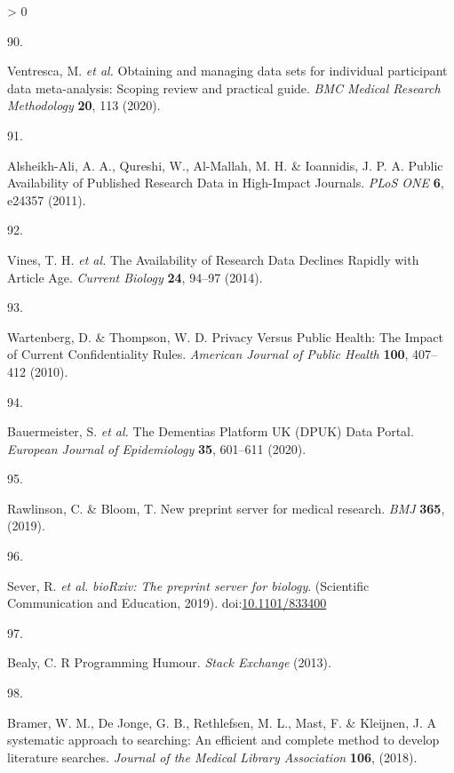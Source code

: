 \documentclass[a4paper, twoside]{templates/ociamthesis}
\newlength{\cslhangindent}
\newlength{\csllabelwidth}
\newenvironment{CSLReferences}[3] %
 {%
  \setlength{\parindent}{0pt}
  \ifodd #1 \everypar{\setlength{\hangindent}{\cslhangindent}}\ignorespaces\fi
  \ifnum #2 > 0
  \setlength{\parskip}{#2\baselineskip}
  \fi
 }%
 {}
\newcommand{\CSLLeftMargin}[1]{\parbox[t]{\maxof{\widthof{#1}}{\csllabelwidth}}{#1}}
\newcommand{\CSLRightInline}[1]{\parbox[t]{\linewidth - \csllabelwidth}{#1}}
\begin{document}
\begin{CSLReferences}{0}{0}
\leavevmode\hypertarget{ref-ventresca2020}{}%
\CSLLeftMargin{90. }
\CSLRightInline{Ventresca, M. \emph{et al.} Obtaining and managing data sets for individual participant data meta-analysis: Scoping review and practical guide. \emph{BMC Medical Research Methodology} \textbf{20}, 113 (2020).}

\leavevmode\hypertarget{ref-alsheikh-ali2011}{}%
\CSLLeftMargin{91. }
\CSLRightInline{Alsheikh-Ali, A. A., Qureshi, W., Al-Mallah, M. H. \& Ioannidis, J. P. A. Public {Availability} of {Published Research Data} in {High}-{Impact Journals}. \emph{PLoS ONE} \textbf{6}, e24357 (2011).}

\leavevmode\hypertarget{ref-vines2014}{}%
\CSLLeftMargin{92. }
\CSLRightInline{Vines, T. H. \emph{et al.} The {Availability} of {Research Data Declines Rapidly} with {Article Age}. \emph{Current Biology} \textbf{24}, 94--97 (2014).}

\leavevmode\hypertarget{ref-wartenberg2010}{}%
\CSLLeftMargin{93. }
\CSLRightInline{Wartenberg, D. \& Thompson, W. D. Privacy {Versus Public Health}: {The Impact} of {Current Confidentiality Rules}. \emph{American Journal of Public Health} \textbf{100}, 407--412 (2010).}

\leavevmode\hypertarget{ref-bauermeister2020}{}%
\CSLLeftMargin{94. }
\CSLRightInline{Bauermeister, S. \emph{et al.} The {Dementias Platform UK} ({DPUK}) {Data Portal}. \emph{European Journal of Epidemiology} \textbf{35}, 601--611 (2020).}

\leavevmode\hypertarget{ref-rawlinson2019}{}%
\CSLLeftMargin{95. }
\CSLRightInline{Rawlinson, C. \& Bloom, T. New preprint server for medical research. \emph{BMJ} \textbf{365}, (2019).}

\leavevmode\hypertarget{ref-sever2019}{}%
\CSLLeftMargin{96. }
\CSLRightInline{Sever, R. \emph{et al.} \emph{{bioRxiv}: The preprint server for biology}. ({Scientific Communication and Education}, 2019). doi:\href{https://doi.org/10.1101/833400}{10.1101/833400}}

\leavevmode\hypertarget{ref-bealy2013}{}%
\CSLLeftMargin{97. }
\CSLRightInline{Bealy, C. R {Programming Humour}. \emph{Stack Exchange} (2013).}

\leavevmode\hypertarget{ref-bramer2018a}{}%
\CSLLeftMargin{98. }
\CSLRightInline{Bramer, W. M., De Jonge, G. B., Rethlefsen, M. L., Mast, F. \& Kleijnen, J. A systematic approach to searching: An efficient and complete method to develop literature searches. \emph{Journal of the Medical Library Association} \textbf{106}, (2018).}


\end{CSLReferences}
\end{document}
